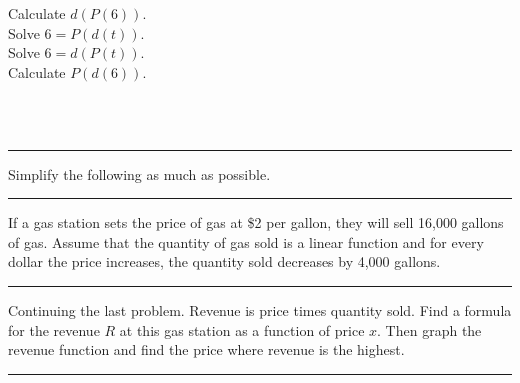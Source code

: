 \documentclass[10pt]{exam}
\begin{document}
\begin{questions}
\begin{choices}
\choice Calculate $d(P(6))$.  \\
\choice Solve $6 = P(d(t))$.   \\
\choice Solve $6 = d(P(t))$.   \\
\choice Calculate $P(d(6))$. \\
\end{choices} 
~\\ 
~\\
\hrule

\newpage
\question Simplify the following as much as possible. 
\hrule 



\question  If a gas station sets the price of gas at \$2 per gallon, they will sell 16,000 gallons of gas.  Assume that the quantity of gas sold is a linear function and for every dollar the price increases, the quantity sold decreases by 4,000 gallons.

\hrule


\question Continuing the last problem.  Revenue is price times quantity sold.  Find a formula for the revenue $R$ at this gas station as a function of price $x$. Then graph the revenue function and find the price where revenue is the highest.
\begin{flushright}
\end{flushright}
\vfill
\hrule



\end{questions}
\end{document}
